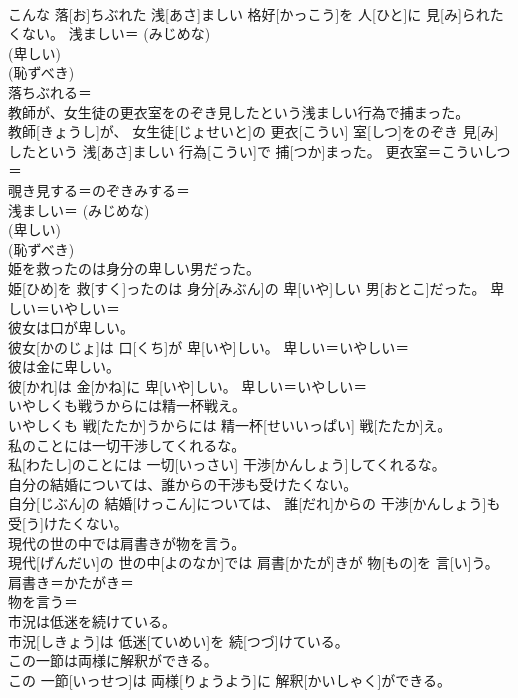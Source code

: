 \documentclass[8pt]{extreport}
\begin{document}
\begin{CJK}{UTF8}{min}
{\\	こんな 落[お]ちぶれた 浅[あさ]ましい 格好[かっこう]を 人[ひと]に 見[み]られたくない。	浅ましい＝ (みじめな) 
\\	(卑しい) 
\\	(恥ずべき) 
\\	落ちぶれる＝ 
\\	教師が、女生徒の更衣室をのぞき見したという浅ましい行為で捕まった。	
\\	教師[きょうし]が、 女生徒[じょせいと]の 更衣[こうい] 室[しつ]をのぞき 見[み]したという 浅[あさ]ましい 行為[こうい]で 捕[つか]まった。	更衣室＝こういしつ＝ 
\\	覗き見する＝のぞきみする＝ 
\\	浅ましい＝ (みじめな) 
\\	(卑しい) 
\\	(恥ずべき) 
\\	姫を救ったのは身分の卑しい男だった。	
\\	姫[ひめ]を 救[すく]ったのは 身分[みぶん]の 卑[いや]しい 男[おとこ]だった。	卑しい＝いやしい＝ 
\\	彼女は口が卑しい。	
\\	彼女[かのじょ]は 口[くち]が 卑[いや]しい。	卑しい＝いやしい＝ 
\\	彼は金に卑しい。	
\\	彼[かれ]は 金[かね]に 卑[いや]しい。	卑しい＝いやしい＝ 
\\	いやしくも戦うからには精一杯戦え。	
\\	いやしくも 戦[たたか]うからには 精一杯[せいいっぱい] 戦[たたか]え。	
\\	私のことには一切干渉してくれるな。	
\\	私[わたし]のことには 一切[いっさい] 干渉[かんしょう]してくれるな。	
\\	自分の結婚については、誰からの干渉も受けたくない。	
\\	自分[じぶん]の 結婚[けっこん]については、 誰[だれ]からの 干渉[かんしょう]も 受[う]けたくない。	
\\	現代の世の中では肩書きが物を言う。	
\\	現代[げんだい]の 世の中[よのなか]では 肩書[かたが]きが 物[もの]を 言[い]う。	肩書き＝かたがき＝ 
\\	物を言う＝ 
\\	市況は低迷を続けている。	
\\	市況[しきょう]は 低迷[ていめい]を 続[つづ]けている。	
\\	この一節は両様に解釈ができる。	
\\	この 一節[いっせつ]は 両様[りょうよう]に 解釈[かいしゃく]ができる。	
}
\end{CJK}
\end{document}
